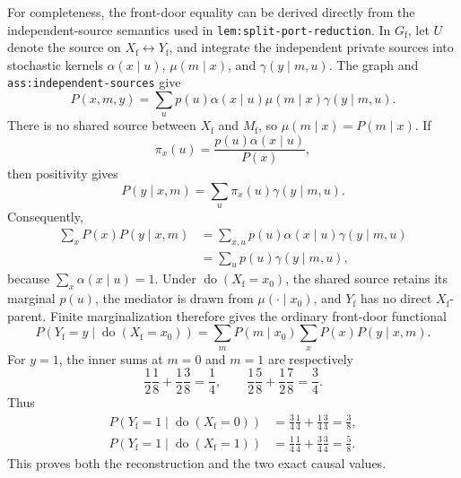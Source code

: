 For completeness, the front-door equality can be derived directly from the independent-source semantics used in \texttt{lem:split-port-reduction}.  In \(G_{\mathrm f}\), let \(U\) denote the source on \(X_{\mathrm f}\leftrightarrow Y_{\mathrm f}\), and integrate the independent private sources into stochastic kernels \(\alpha(x\mid u)\), \(\mu(m\mid x)\), and \(\gamma(y\mid m,u)\).  The graph and \texttt{ass:independent-sources} give
\[
 P(x,m,y)=\sum_u p(u)\alpha(x\mid u)\mu(m\mid x)\gamma(y\mid m,u).
\]
There is no shared source between \(X_{\mathrm f}\) and \(M_{\mathrm f}\), so \(\mu(m\mid x)=P(m\mid x)\).  If
\[
 \pi_x(u)=\frac{p(u)\alpha(x\mid u)}{P(x)},
\]
then positivity gives
\[
 P(y\mid x,m)=\sum_u\pi_x(u)\gamma(y\mid m,u).
\]
Consequently,
\[
\begin{aligned}
 \sum_xP(x)P(y\mid x,m)
 &=\sum_{x,u}p(u)\alpha(x\mid u)\gamma(y\mid m,u)\\
 &=\sum_up(u)\gamma(y\mid m,u),
\end{aligned}
\]
because \(\sum_x\alpha(x\mid u)=1\).  Under \(\operatorname{do}(X_{\mathrm f}=x_0)\), the shared source retains its marginal \(p(u)\), the mediator is drawn from \(\mu(\cdot\mid x_0)\), and \(Y_{\mathrm f}\) has no direct \(X_{\mathrm f}\)-parent.  Finite marginalization therefore gives the ordinary front-door functional
\[
 P(Y_{\mathrm f}=y\mid\operatorname{do}(X_{\mathrm f}=x_0))
 =\sum_mP(m\mid x_0)\sum_xP(x)P(y\mid x,m).
\]
For \(y=1\), the inner sums at \(m=0\) and \(m=1\) are respectively
\[
 \frac12\frac18+\frac12\frac38=\frac14,
 \qquad
 \frac12\frac58+\frac12\frac78=\frac34.
\]
Thus
\[
\begin{aligned}
 P(Y_{\mathrm f}=1\mid\operatorname{do}(X_{\mathrm f}=0))
 &=\frac34\frac14+\frac14\frac34=\frac38,\\
 P(Y_{\mathrm f}=1\mid\operatorname{do}(X_{\mathrm f}=1))
 &=\frac14\frac14+\frac34\frac34=\frac58.
\end{aligned}
\]
This proves both the reconstruction and the two exact causal values.